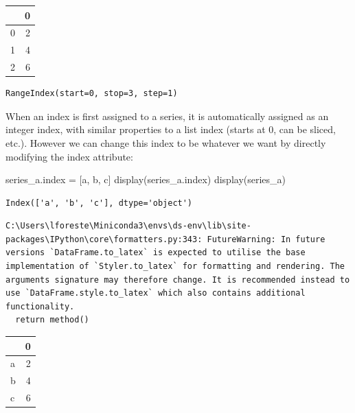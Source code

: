 \documentclass[
  letterpaper,
  DIV=11,
  numbers=noendperiod]{scrreprt}
\newenvironment{Shaded}{\begin{snugshade}}{\end{snugshade}}
\newcommand{\NormalTok}[1]{\textcolor[rgb]{0.00,0.23,0.31}{#1}}
\newcommand{\OperatorTok}[1]{\textcolor[rgb]{0.37,0.37,0.37}{#1}}
\newcommand{\StringTok}[1]{\textcolor[rgb]{0.13,0.47,0.30}{#1}}
\begin{document}
\begin{tabular}{lr}
\toprule
{} &  0 \\
\midrule
0 &  2 \\
1 &  4 \\
2 &  6 \\
\bottomrule
\end{tabular}

\begin{verbatim}
RangeIndex(start=0, stop=3, step=1)
\end{verbatim}

When an index is first assigned to a series, it is automatically
assigned as an integer index, with similar properties to a list index
(starts at 0, can be sliced, etc.). However we can change this index to
be whatever we want by directly modifying the index attribute:

\begin{Shaded}
\begin{Highlighting}[]
\NormalTok{series\_a.index }\OperatorTok{=}\NormalTok{ [}\StringTok{\textquotesingle{}a\textquotesingle{}}\NormalTok{, }\StringTok{\textquotesingle{}b\textquotesingle{}}\NormalTok{, }\StringTok{\textquotesingle{}c\textquotesingle{}}\NormalTok{]}
\NormalTok{display(series\_a.index)}
\NormalTok{display(series\_a)}
\end{Highlighting}
\end{Shaded}

\begin{verbatim}
Index(['a', 'b', 'c'], dtype='object')
\end{verbatim}

\begin{verbatim}
C:\Users\lforeste\Miniconda3\envs\ds-env\lib\site-packages\IPython\core\formatters.py:343: FutureWarning: In future versions `DataFrame.to_latex` is expected to utilise the base implementation of `Styler.to_latex` for formatting and rendering. The arguments signature may therefore change. It is recommended instead to use `DataFrame.style.to_latex` which also contains additional functionality.
  return method()
\end{verbatim}

\begin{tabular}{lr}
\toprule
{} &  0 \\
\midrule
a &  2 \\
b &  4 \\
c &  6 \\
\bottomrule
\end{tabular}
\end{document}
